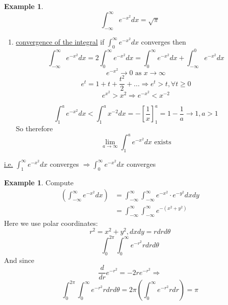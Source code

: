 \documentclass[12pt]{article}
\theoremstyle{plain}
\theoremstyle{definition}
\newtheorem{example}[theorem]{Example}
\begin{document}
\begin{example}
	$$\int^\infty_{-\infty} e^{-x^2} dx = \sqrt{\pi}$$

	\begin{enumerate}
		\item{
		\underline{convergence of the integral}
		if $\int^\infty_{0} e^{-x^2} dx$ converges then
		$$\int^\infty_{-\infty} e^{-x^2} dx = 2 \int^\infty_{0} e^{-x^2} dx = \int^\infty_{0} e^{-x^2} dx + \int^0_{-\infty} e^{-x^2} dx$$
		$$e^{-x^2} \to 0 \text{ as } x \to \infty$$
		$$e^t = 1 + t+  \frac{t^2}{2} + ... \Longrightarrow e^t > t, \forall t \geq 0$$
		$$e^{x^2} > x^2 \Longrightarrow e^{-x^2} < x^{-2}$$
		
		$$\int^a_1e^{-x^2} dx < \int^a_1x^{-2} dx = -[\frac{1}{x}]^a_1 = 1 - \frac{1}{a} \to 1, a > 1$$
		So therefore
		$$\lim_{a\to\infty} \int_1^a e^{-x^2} dx \text{ exists}$$
		}
	\end{enumerate}
	\underline{i.e.} $\int^\infty_{1} e^{-x^2} dx$ converges $\Longrightarrow \int^\infty_{0} e^{-x^2} dx$ converges

\end{example}

\begin{example}
	Compute 
	\begin{align*}
		(\int^\infty_{-\infty} e^{-x^2} dx) &= \int^\infty_{-\infty} \int^\infty_{-\infty} e^{-x^2} \cdot e^{-y^2} dx dy\\
		&= \int^\infty_{-\infty} \int^\infty_{-\infty} e^{-(x^2 + y^2)}
	\end{align*}
	Here we use polar coordinates:
	$$r^2 = x^2 + y^2, dxdy=rdrd\theta$$
	$$\int^{2\pi}_0 \int^\infty_0 e^{-r^2} rdrd\theta$$
	And since
	$$\frac{d}{dr} e^{-r^2} = -2re^{-r^2} \Longrightarrow$$
	$$\int^{2\pi}_0 \int^\infty_0 e^{-r^2} rdrd\theta = 2\pi (\int^\infty_0 e^{-r^2} rdr) = \pi$$

\end{example}
\end{document}

